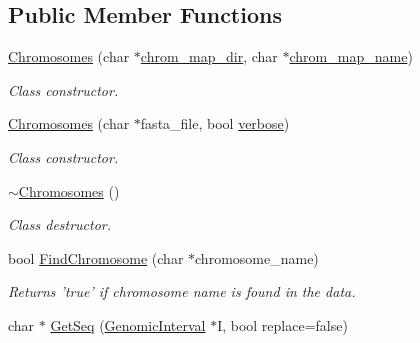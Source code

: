 \subsection*{Public Member Functions}
\begin{DoxyCompactItemize}
\item 
\hyperlink{classChromosomes_aa302dd8cf19592e981e02f2e02e619e6}{Chromosomes} (char $\ast$\hyperlink{classChromosomes_a5fb6a314ac56a7ace50070fd3e5ae708}{chrom\_\-map\_\-dir}, char $\ast$\hyperlink{classChromosomes_a71b69dff9fc8c4cae1671df17e11a016}{chrom\_\-map\_\-name})
\begin{DoxyCompactList}\small\item\em Class constructor. \end{DoxyCompactList}\item 
\hyperlink{classChromosomes_abb3466c6c94f42f22a872b043c415b67}{Chromosomes} (char $\ast$fasta\_\-file, bool \hyperlink{classChromosomes_a954bae240564f6f589a30d253291eb75}{verbose})
\begin{DoxyCompactList}\small\item\em Class constructor. \end{DoxyCompactList}\item 
\hypertarget{classChromosomes_a0b04a0781b2ff7088dd8046493385003}{
\hyperlink{classChromosomes_a0b04a0781b2ff7088dd8046493385003}{$\sim$Chromosomes} ()}
\label{classChromosomes_a0b04a0781b2ff7088dd8046493385003}

\begin{DoxyCompactList}\small\item\em Class destructor. \end{DoxyCompactList}\item 
\hypertarget{classChromosomes_a2378b5cab810d50699d97883fe1c04bf}{
bool \hyperlink{classChromosomes_a2378b5cab810d50699d97883fe1c04bf}{FindChromosome} (char $\ast$chromosome\_\-name)}
\label{classChromosomes_a2378b5cab810d50699d97883fe1c04bf}

\begin{DoxyCompactList}\small\item\em Returns 'true' if chromosome name is found in the data. \end{DoxyCompactList}\item 
\hypertarget{classChromosomes_a819d0fa5f41c034a45949156307d02e4}{
char $\ast$ \hyperlink{classChromosomes_a819d0fa5f41c034a45949156307d02e4}{GetSeq} (\hyperlink{classGenomicInterval}{GenomicInterval} $\ast$I, bool replace=false)}
\label{classChromosomes_a819d0fa5f41c034a45949156307d02e4}


\end{DoxyCompactItemize}
